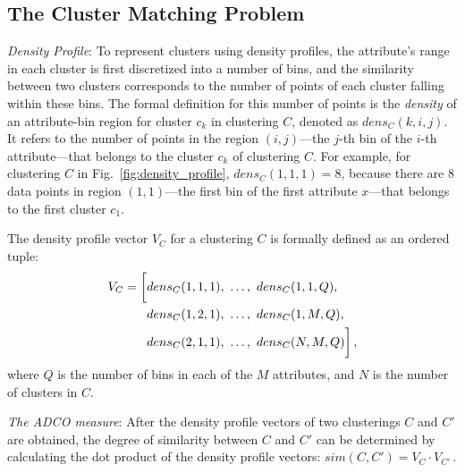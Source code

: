 \subsection{The Cluster Matching Problem}
\label{sec:clusterMatching}
\emph{Density Profile}: To represent clusters using density profiles, the attribute's range in each cluster is first discretized into a number of bins, and the similarity between two clusters corresponds to the number of points of each cluster falling within these bins. The formal definition for this number of points is the \textit{density} of an attribute-bin region for cluster $c_k$ in clustering $C$, denoted as $dens_C(k, i, j)$. It refers to the number of points in the region $(i, j)$---the $j$-th bin of the $i$-th attribute---that belongs to the cluster $c_k$ of clustering $C$. For example, for clustering $C$ in Fig.~\ref{fig:density_profile}, $dens_C(1, 1, 1) = 8$, because there are 8 data points in region $(1, 1)$---the first bin of the first attribute $x$---that belongs to the first cluster $c_1$.


The density profile vector $V_C$ for a clustering $C$ is formally defined as an ordered tuple:
\begin{align}
\notag V_C = \bigg[ & dens_C(1, 1, 1), ~\ldots, ~dens_C (1, 1, Q),\\
\notag & dens_C (1, 2, 1), ~\ldots, ~dens_C (1, M, Q),\\
& dens_C (2, 1, 1), ~\ldots, ~dens_C (N, M, Q) \bigg]\, ,\label{eq:densp}
\end{align}
where $Q$ is the number of bins in each of the $M$ attributes, and $N$ is the number of clusters in $C$.

\emph{The ADCO measure}: After the density profile vectors of two clusterings $C$ and $C'$ are obtained, the degree of similarity between  $C$ and $C'$ can be determined by calculating the dot product of the density profile vectors:
$sim(C, C') = V_C  \cdot V_{C'} \, .$

